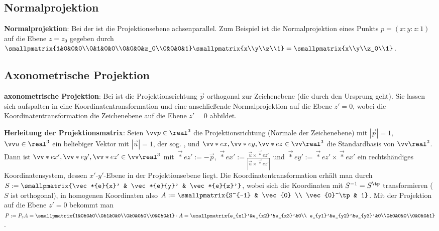 \subsection{%
    Normalprojektion%
}

\textbf{Normalprojektion}:
Bei der  ist die Projektionsebene achsenparallel.
Zum Beispiel ist die Normalprojektion eines Punkts $p = (x:y:z:1)$ auf die Ebene $z = z_0$
gegeben durch
$\smallpmatrix{1&0&0&0\\0&1&0&0\\0&0&0&z_0\\0&0&0&1} \smallpmatrix{x\\y\\z\\1} =
\smallpmatrix{x\\y\\z_0\\1}$.

\subsection{%
    Axonometrische Projektion%
}

\textbf{axonometrische Projektion}:
Bei  ist die Projektionsrichtung $\vec{p}$ orthogonal
zur Zeichenebene (die durch den Ursprung geht).
Sie lassen sich aufspalten in eine Koordinatentransformation und eine anschließende
Normalprojektion auf die Ebene $z' = 0$,
wobei die Koordinatentransformation die Zeichenebene auf die Ebene $z' = 0$ abbildet.

\textbf{Herleitung der Projektionsmatrix}:
Seien $\vec{p} \in \real^3$ die Projektionsrichtung (Normale der Zeichenebene) mit $|\vec{p}| = 1$,
$\vec{u} \in \real^3$ ein beliebiger Vektor mit $|\vec{u}| = 1$, der sog. ,
und $\vec*{e}{x}, \vec*{e}{y}, \vec*{e}{z} \in \vec{\real}^3$ die Standardbasis von
$\vec{\real}^3$.
Dann ist $\vec*{e}{x}', \vec*{e}{y}', \vec*{e}{z}' \in \vec{\real}^3$
mit $\vec*{e}{z}' := -\vec{p}$,
$\vec*{e}{x}' := \frac{\vec{u} \times \vec*{e}{z}'}{|\vec{u} \times \vec*{e}{z}'|}$ und
$\vec*{e}{y}' := \vec*{e}{z}' \times \vec*{e}{x}'$
ein rechtshändiges Koordinatensystem, dessen $x'$-$y'$-Ebene in der Projektionsebene liegt.
Die Koordinatentransformation erhält man durch
$S := \smallpmatrix{\vec*{e}{x}' & \vec*{e}{y}' & \vec*{e}{z}'}$,
wobei sich die Koordinaten mit $S^{-1} = S^\tp$ transformieren ($S$ ist orthogonal),
in homogenen Koordinaten also $A := \smallpmatrix{S^{-1} & \vec{0} \\ \vec{0}^\tp & 1}$.
Mit der Projektion auf die Ebene $z' = 0$ bekommt man
$P := P_z A = \smallpmatrix{1&0&0&0\\0&1&0&0\\0&0&0&0\\0&0&0&1} \cdot A
= \smallpmatrix{e_{x1}'&e_{x2}'&e_{x3}'&0\\
e_{y1}'&e_{y2}'&e_{y3}'&0\\0&0&0&0\\0&0&0&1}$.

